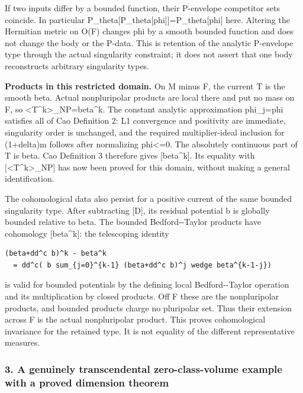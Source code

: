 \documentclass[11pt]{article}
\begin{document}
If two inputs differ by a bounded function, their P-\allowbreak{}envelope competitor sets coincide. In particular P\_\allowbreak{}theta[P\_\allowbreak{}theta[phi]]=\allowbreak{}P\_\allowbreak{}theta[phi] here. Altering the Hermitian metric on O(F) changes phi by a smooth bounded function and does not change the body or the P-\allowbreak{}data. This is retention of the analytic P-\allowbreak{}envelope type through the actual singularity constraint; it does not assert that one body reconstructs arbitrary singularity types.

\textbf{Products in this restricted domain.} On M minus F, the current T is the smooth beta. Actual nonpluripolar products are local there and put no mass on F, so <T\textasciicircum{}\allowbreak{}k>\_\allowbreak{}NP=\allowbreak{}beta\textasciicircum{}\allowbreak{}k. The constant analytic approximation phi\_\allowbreak{}j=\allowbreak{}phi satisfies all of Cao Definition 2: L1 convergence and positivity are immediate, singularity order is unchanged, and the required multiplier-\allowbreak{}ideal inclusion for (1+delta)m follows after normalizing phi<=\allowbreak{}0. The absolutely continuous part of T is beta. Cao Definition 3 therefore gives [beta\textasciicircum{}\allowbreak{}k]. Its equality with [<T\textasciicircum{}\allowbreak{}k>\_\allowbreak{}NP] has now been proved for this domain, without making a general identification.

The cohomological data also persist for a positive current of the same bounded singularity type. After subtracting [D], its residual potential b is globally bounded relative to beta. The bounded Bedford-\allowbreak{}-\allowbreak{}Taylor products have cohomology [beta\textasciicircum{}\allowbreak{}k]: the telescoping identity

\begin{Verbatim}[breaklines=true,fontsize=\small]
(beta+dd^c b)^k - beta^k
  = dd^c( b sum_{j=0}^{k-1} (beta+dd^c b)^j wedge beta^{k-1-j})
\end{Verbatim}

is valid for bounded potentials by the defining local Bedford-\allowbreak{}-\allowbreak{}Taylor operation and its multiplication by closed products. Off F these are the nonpluripolar products, and bounded products charge no pluripolar set. Thus their extension across F is the actual nonpluripolar product. This proves cohomological invariance for the retained type. It is not equality of the different representative measures.

\subsubsection{3. A genuinely transcendental zero-\allowbreak{}class-\allowbreak{}volume example with a proved dimension theorem}
\end{document}
